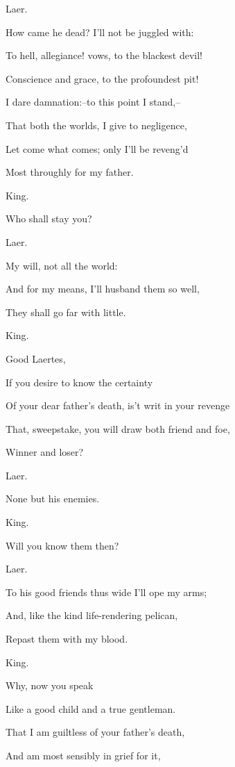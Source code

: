 \documentclass[12pt]{book}
\begin{document}
Laer.

How came he dead? I'll not be juggled with:

To hell, allegiance! vows, to the blackest devil!

Conscience and grace, to the profoundest pit!

I dare damnation:--to this point I stand,--

That both the worlds, I give to negligence,

Let come what comes; only I'll be reveng'd

Most throughly for my father.



King.

Who shall stay you?



Laer.

My will, not all the world:

And for my means, I'll husband them so well,

They shall go far with little.



King.

Good Laertes,

If you desire to know the certainty

Of your dear father's death, is't writ in your revenge

That, sweepstake, you will draw both friend and foe,

Winner and loser?



Laer.

None but his enemies.



King.

Will you know them then?



Laer.

To his good friends thus wide I'll ope my arms;

And, like the kind life-rendering pelican,

Repast them with my blood.



King.

Why, now you speak

Like a good child and a true gentleman.

That I am guiltless of your father's death,

And am most sensibly in grief for it,
\end{document}
